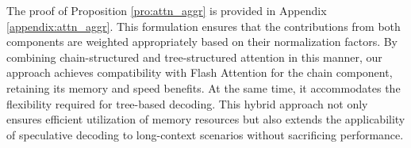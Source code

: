 The proof of Proposition \ref{pro:attn_aggr} is provided in Appendix \ref{appendix:attn_aggr}. This formulation ensures that the contributions from both components are weighted appropriately based on their normalization factors. By combining chain-structured and tree-structured attention in this manner, our approach achieves compatibility with Flash Attention for the chain component, retaining its memory and speed benefits. At the same time, it accommodates the flexibility required for tree-based decoding. This hybrid approach not only ensures efficient utilization of memory resources but also extends the applicability of speculative decoding to long-context scenarios without sacrificing performance.
